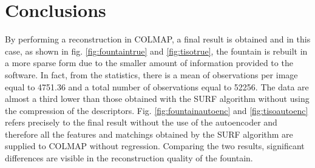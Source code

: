 

\section{Conclusions}
By performing a reconstruction in COLMAP, a final result is obtained and in this case, as shown in fig. \ref{fig:fountaintrue} and \ref{fig:tisotrue}, the fountain is rebuilt in a more sparse form due to the smaller amount of information provided to the software. In fact, from the statistics, there is a mean of observations per image equal to 4751.36 and a total number of observations equal to 52256. The data are almost a third lower than those obtained with the SURF algorithm without using the compression of the descriptors. Fig. \ref{fig:fountainautoenc} and \ref{fig:tisoautoenc} refers precisely to the final result without the use of the autoencoder and therefore all the features and matchings obtained by the SURF algorithm are supplied to COLMAP without regression. Comparing the two results, significant differences are visible in the reconstruction quality of the fountain.


